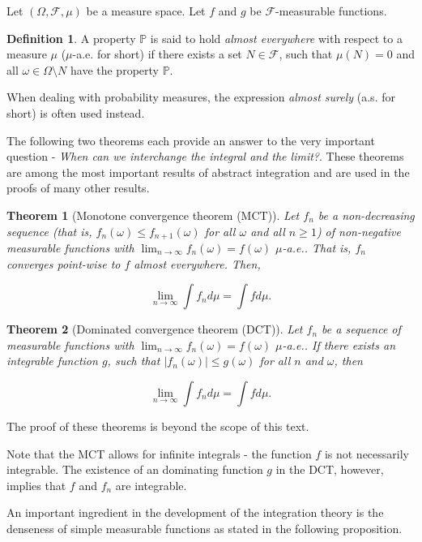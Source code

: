 \documentclass{book}
\theoremstyle{plain}%
\newtheorem{theorem}{Theorem}[section]
\theoremstyle{definition}
\newtheorem{definition}{Definition}[section]
\newlength{\arrow}
\begin{document}
Let $(\Omega, \mathcal{F}, \mu)$ be a measure space. Let $f$ and $g$ be $\mathcal{F}$-measurable functions.

\begin{definition}
A property $\mathbb{P}$ is said to hold \emph{almost everywhere} with respect to a measure $\mu$ ($\mu$-a.e. for short) if there exists a set $N \in \mathcal{F}$, such that $\mu(N) = 0$ and all $\omega \in \Omega \setminus N$ have the property $\mathbb{P}$.
\end{definition}

When dealing with probability measures, the expression \emph{almost surely} (a.s. for short) is often used instead.

The following two theorems each provide an answer to the very important question - \emph{When can we interchange the integral and the limit?}. These theorems are among the most important results of abstract integration and are used in the proofs of many other results.

\begin{theorem}[Monotone convergence theorem (MCT)]
Let $f_n$ be a non-decreasing sequence (that is, $f_n(\omega) \leq f_{n+1}(\omega)$ for all $\omega$ and all $n \geq 1$) of non-negative measurable functions with $\lim_{n \rightarrow \infty} f_n(\omega)  = f(\omega)$ $\mu$-a.e.. That is, $f_n$ converges point-wise to $f$ almost everywhere. Then,

$$\lim_{n \rightarrow \infty}  \int f_n d\mu = \int f d\mu.$$
\label{thm:mct}
\end{theorem}

\begin{theorem}[Dominated convergence theorem (DCT)]
Let $f_n$ be a sequence of measurable functions with $\lim_{n \rightarrow \infty} f_n(\omega)  = f(\omega)$ $\mu$-a.e.. If there exists an integrable function $g$, such that $|f_n(\omega) | \leq g(\omega)$ for all $n$ and $\omega$, then

$$\lim_{n \rightarrow \infty}  \int f_n d\mu = \int f d\mu.$$
\label{thm:mct}
\end{theorem}

The proof of these theorems is beyond the scope of this text.

Note that the MCT allows for infinite integrals - the function $f$ is not necessarily integrable. The existence of an dominating function $g$ in the DCT, however, implies that $f$ and $f_n$ are integrable.

An important ingredient in the development of the integration theory is the denseness of simple measurable functions as stated in the following proposition. 
    
\end{document}
